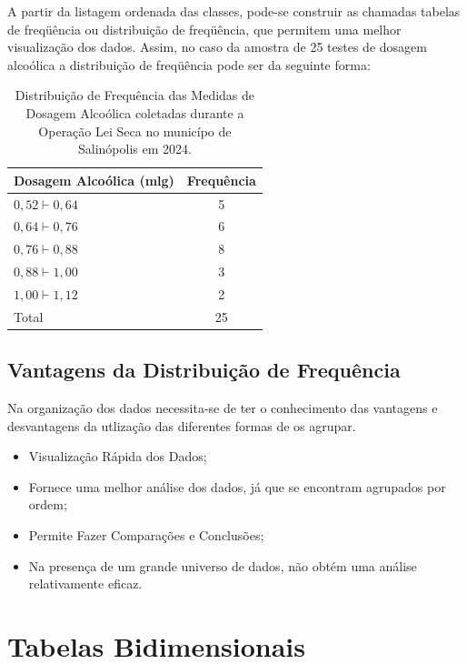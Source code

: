 A partir da listagem ordenada das classes, pode-se construir as chamadas tabelas de freqüência ou distribuição de freqüência, que permitem uma melhor visualização dos dados. Assim, no caso da amostra de 25 testes de dosagem alcoólica a distribuição de freqüência pode ser da seguinte forma:

\begin{table}[h]
    \centering
    {
    \caption{Distribuição de Frequência das Medidas de Dosagem Alcoólica coletadas durante a Operação Lei Seca no municípo de Salinópolis em 2024.}
    \label{toxalimentar}
    \vspace{-0.1cm}
\begin{tabular}{l|c}
  \hline\hline
  Dosagem Alcoólica (mlg) & Frequência \\
  \hline\hline
  $0,52 \vdash 0,64$ & 5 \\
  $0,64 \vdash 0,76$ & 6 \\
  $0,76 \vdash 0,88$ & 8 \\
  $0,88 \vdash 1,00$ & 3 \\
  $1,00 \vdash 1,12$ & 2 \\
  \hline\hline
  Total & 25 \\
    \hline\hline
\end{tabular}}
\end{table}

\newpage
\subsection{Vantagens da Distribuição de Frequência}

Na organização dos dados necessita-se de ter o conhecimento das vantagens e desvantagens da utlização das diferentes formas de os agrupar.\vskip0.3cm

\begin{itemize}
    \item Visualização Rápida dos Dados;
    \item Fornece uma melhor análise dos dados, já que se encontram agrupados por ordem;
    \item Permite Fazer Comparações e Conclusões;
     \item Na presença de um grande universo de dados, não obtém uma análise relativamente eficaz.
\end{itemize}

\newpage
\section{Tabelas Bidimensionais}

